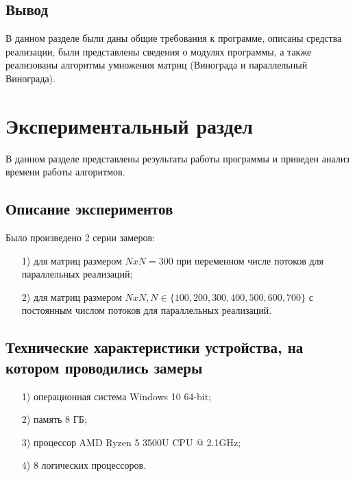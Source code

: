 \documentclass[14pt, a4paper]{extarticle}
\begin{document}
\subsection{Вывод}
В данном разделе были даны общие требования к программе, описаны средства реализации, были представлены сведения о модулях программы, а также реализованы алгоритмы умножения матриц (Винограда и параллельный Винограда).

\clearpage
\section{Экспериментальный раздел}
В данном разделе представлены результаты работы программы и приведен анализ времени работы алгоритмов.
\subsection{Описание экспериментов}
Было произведено 2 серии замеров:
\begin{enumerate}
	\item[1)] для матриц размером $N x N = 300$ при переменном числе потоков для параллельных реализаций;
	\item[2)] для матриц размером $N x N, N \in \{100,200,300,400,500,600,700\}$ с постоянным числом потоков для параллельных реализаций.
\end{enumerate}
\subsection{Технические характеристики устройства, на котором проводились замеры}
\begin{enumerate}
	\item[1)] операционная система Windows 10 64-bit;
	\item[2)] память 8 ГБ;
	\item[3)] процессор AMD Ryzen 5 3500U CPU @ 2.1GHz;
	\item[4)] 8 логических процессоров.
\end{enumerate}
\clearpage
\end{document}
